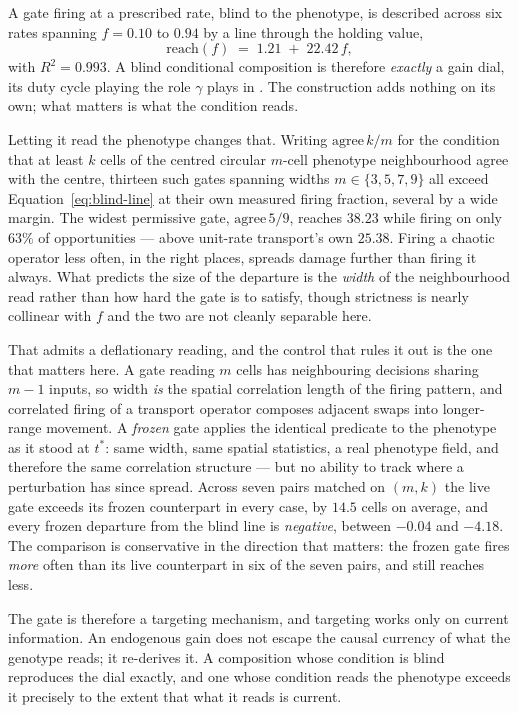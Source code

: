 A gate firing at a prescribed rate, blind to the phenotype, is described across
six rates spanning $f = 0.10$ to $0.94$ by a line through the holding value,
%
\begin{equation}
  \mathrm{reach}(f) \;=\; 1.21 \;+\; 22.42\,f ,
  \label{eq:blind-line}
\end{equation}
%
with $R^{2} = 0.993$. A blind conditional composition is therefore \emph{exactly}
a gain dial, its duty cycle playing the role $\gamma$ plays in
. The construction adds nothing on its own; what matters is what
the condition reads.

Letting it read the phenotype changes that. Writing $\mathrm{agree}\,k/m$ for the
condition that at least $k$ cells of the centred circular $m$-cell phenotype
neighbourhood agree with the centre, thirteen such gates spanning widths
$m \in \{3,5,7,9\}$ all exceed Equation~\eqref{eq:blind-line} at their own
measured firing fraction, several by a wide margin. The widest permissive gate,
$\mathrm{agree}\,5/9$, reaches $38.23$ while firing on only $63\%$ of
opportunities --- above unit-rate transport's own $25.38$. Firing a chaotic
operator less often, in the right places, spreads damage further than firing it
always. What predicts the size of the departure is the \emph{width} of the
neighbourhood read rather than how hard the gate is to satisfy, though strictness is
nearly collinear with $f$ and the two are not cleanly separable here.

That admits a deflationary reading, and the control that rules it out is the one
that matters here. A gate reading $m$ cells has neighbouring decisions sharing
$m-1$ inputs, so width \emph{is} the spatial correlation length of the firing
pattern, and correlated firing of a transport operator composes adjacent swaps
into longer-range movement. A \emph{frozen} gate applies the identical predicate
to the phenotype as it stood at $t^{*}$: same width, same spatial statistics, a
real phenotype field, and therefore the same correlation structure --- but no
ability to track where a perturbation has since spread. Across seven pairs
matched on $(m,k)$ the live gate exceeds its frozen counterpart in every case, by
$14.5$ cells on average, and every frozen departure from the blind line is
\emph{negative}, between $-0.04$ and $-4.18$. The comparison is conservative in
the direction that matters: the frozen gate fires \emph{more} often than its live
counterpart in six of the seven pairs, and still reaches less.

The gate is therefore a targeting mechanism, and targeting works only on current
information. An endogenous gain does not escape the causal currency of what the
genotype reads; it re-derives it. A composition whose condition is blind
reproduces the dial exactly, and one whose condition reads the phenotype exceeds
it precisely to the extent that what it reads is current.

